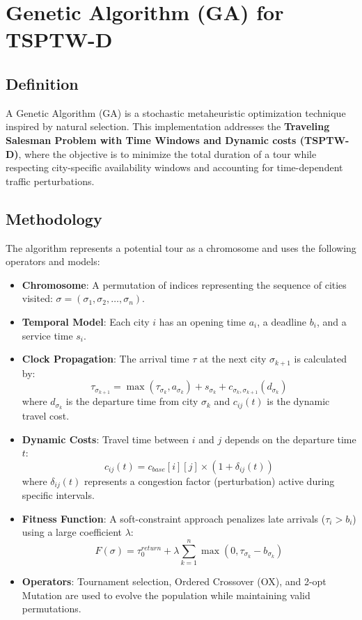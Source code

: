 \documentclass{article}
\begin{document}
\section*{Genetic Algorithm (GA) for TSPTW-D}
\subsection*{Definition}
A Genetic Algorithm (GA) is a stochastic metaheuristic optimization technique inspired by natural selection. This
implementation addresses the \textbf{Traveling Salesman Problem with Time Windows and Dynamic costs (TSPTW-D)},
where the objective is to minimize the total duration of a tour while respecting city-specific availability
windows and accounting for time-dependent traffic perturbations.
\subsection*{Methodology}
The algorithm represents a potential tour as a chromosome and uses the following operators and models:
\begin{itemize}
    \item \textbf{Chromosome}: A permutation of indices representing the sequence of cities visited: $\sigma =
(\sigma_1, \sigma_2, \dots, \sigma_n)$.
    \item \textbf{Temporal Model}: Each city $i$ has an opening time $a_i$, a deadline $b_i$, and a service time
$s_i$.
    \item \textbf{Clock Propagation}: The arrival time $\tau$ at the next city $\sigma_{k+1}$ is calculated by:
    \[ \tau_{\sigma_{k+1}} = \max(\tau_{\sigma_k}, a_{\sigma_k}) + s_{\sigma_k} + c_{\sigma_k,
\sigma_{k+1}}(d_{\sigma_k}) \]
    where $d_{\sigma_k}$ is the departure time from city $\sigma_k$ and $c_{ij}(t)$ is the dynamic travel cost.
    \item \textbf{Dynamic Costs}: Travel time between $i$ and $j$ depends on the departure time $t$:
    \[ c_{ij}(t) = c_{base}[i][j] \times (1 + \delta_{ij}(t)) \]
    where $\delta_{ij}(t)$ represents a congestion factor (perturbation) active during specific intervals.
    \item \textbf{Fitness Function}: A soft-constraint approach penalizes late arrivals ($\tau_i > b_i$) using a
large coefficient $\lambda$:
    \[ F(\sigma) = \tau_0^{return} + \lambda \sum_{k=1}^{n} \max(0, \tau_{\sigma_k} - b_{\sigma_k}) \]
    \item \textbf{Operators}: Tournament selection, Ordered Crossover (OX), and 2-opt Mutation are used to evolve
the population while maintaining valid permutations.
\end{itemize}
\end{document}
